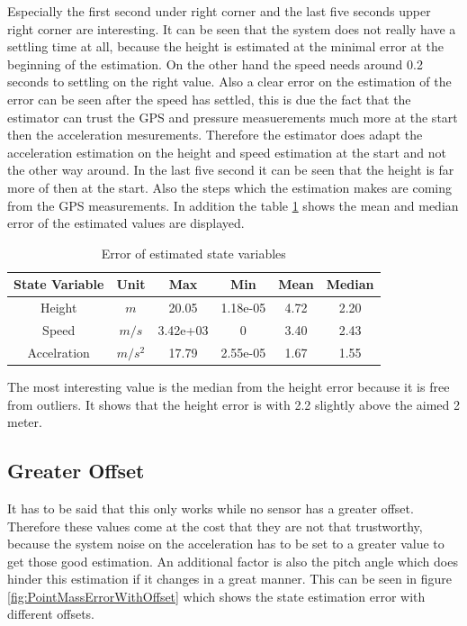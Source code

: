 Especially the first second under right corner and the last five seconds upper right corner are interesting.
It can be seen that the system does not really have a settling time at all,
because the height is estimated at the minimal error at the beginning of the estimation.
On the other hand the speed needs around 0.2 seconds to settling on the right value.
Also a clear error on the estimation of the error can be seen after the speed has settled,
this is due the fact that the estimator can trust the GPS and pressure measuerements much more at the start then the acceleration mesurements.
Therefore the estimator does adapt the acceleration estimation on the height and speed estimation at the start and not the other way around.
In the last five second it can be seen that the height is far more of then at the start.
Also the steps which the estimation makes are coming from the GPS measurements.
In addition the table \ref{tab:ErrorPointMass} shows the mean and median error of the estimated values are displayed.

\begin{table}[h!]
\centering
\begin{tabular}{cccccc}
\hline
\multicolumn{1}{|c|}{State Variable} & \multicolumn{1}{c|}{Unit} & \multicolumn{1}{c|}{Max} & \multicolumn{1}{c|}{Min} & \multicolumn{1}{c|}{Mean} & \multicolumn{1}{c|}{Median} \\ \hline
Height                            & $m$                         & 20.05                  & 1.18e-05                 & 4.72                    & 2.20                      \\
Speed                             & $m/s$                       & 3.42e+03               & 0                        & 3.40                    & 2.43                      \\
Accelration                       & $m/s^2$   			& 17.79                  & 2.55e-05                 & 1.67                    & 1.55                     
\end{tabular}
\caption{Error of estimated state variables}
\label{tab:ErrorPointMass}
\end{table}

The most interesting value is the median from the height error because it is free from outliers.
It shows that the height error is with 2.2 slightly above the aimed 2 meter.

\subsection{Greater Offset}
It has to be said that this only works while no sensor has a greater offset.
Therefore these values come at the cost that they are not that trustworthy, 
because the system noise on the acceleration has to be set to a greater value to get those good estimation.
An additional factor is also the pitch angle which does hinder this estimation if it changes in a great manner.
This can be seen in figure \ref{fig:PointMassErrorWithOffset} which shows the state estimation error with different offsets.

